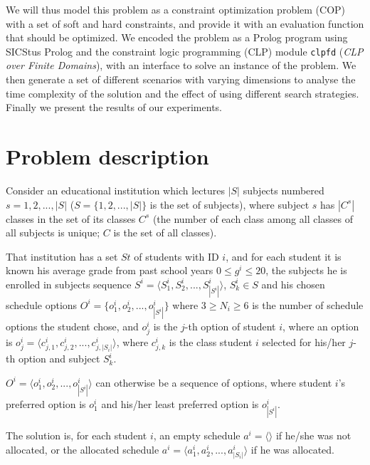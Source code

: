 \documentclass[runningheads]{llncs}
\begin{document}
We will thus model this problem as a constraint optimization problem (COP) with a set of soft and hard constraints, and provide it with an evaluation function that should be optimized.
We encoded the problem as a Prolog program using SICStus Prolog \cite{sicstus} and the constraint logic programming (CLP) module \texttt{clpfd} (\textit{CLP over Finite Domains}), with an interface to solve an instance of the problem.
We then generate a set of different scenarios with varying dimensions to analyse the time complexity of the solution and the effect of using different search strategies.
Finally we present the results of our experiments.

\section{Problem description}

Consider an educational institution which lectures $|S|$ subjects numbered $s=1, 2, ... , |S|$ ($S = \{1, 2, ..., |S|\}$ is the set of subjects), where subject $s$ has $|C^s|$ classes in the set of its classes $C^s$ (the number of each class among all classes of all subjects is unique; $C$ is the set of all classes).

That institution has a set $St$ of students with ID $i$, and for each student it is known his average grade from past school years $0 \leq g^i \leq 20$, the subjects he is enrolled in subjects sequence $S^i = \langle S^i_1, S^i_2, ..., S^i_{|S^i|} \rangle$, $S^i_k \in S$ and his chosen schedule options $O^i = \{o^i_1, o^i_2, ..., o^i_{|S^i|}\}$ where $3 \geq N_i \geq 6$ is the number of schedule options the student chose, and $o^i_j$ is the $j$-th option of student $i$, where an option is $o^i_j = \langle c^i_{j, 1}, c^i_{j, 2}, ..., {c^i_{j, |S_i|}} \rangle$, where $c^i_{j,k}$ is the class student $i$ selected for his/her $j$-th option and subject $S^i_k$.

$O^i = \langle o^i_1, o^i_2, ..., o^i_{|S^i|} \rangle$ can otherwise be a sequence of options, where student $i$'s preferred option is $o^i_1$ and his/her least preferred option is $o^i_ {|S^i|}$.

The solution is, for each student $i$, an empty schedule $a^i=\langle \rangle$ if he/she was not allocated, or the allocated schedule $a^i = \langle a^i_1, a^i_2, ..., a^i_{|S_i|} \rangle$ if he was allocated.
\end{document}
